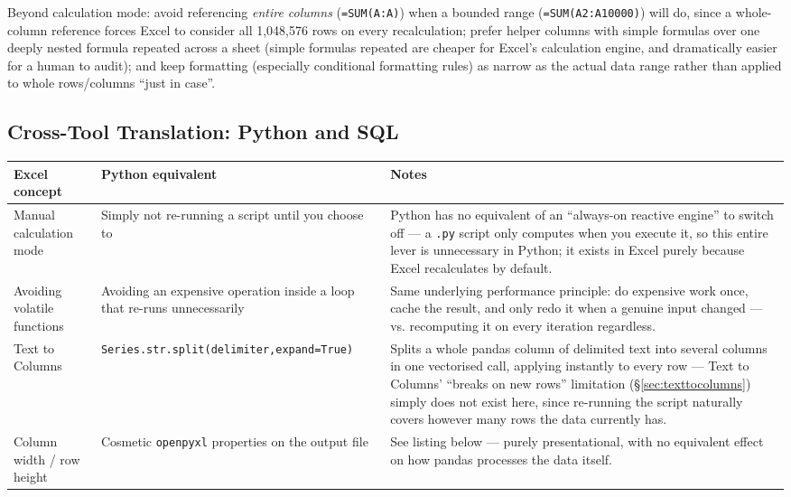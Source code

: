 \documentclass[11pt,a4paper]{article}
\begin{document}
\begin{protip}
Beyond calculation mode: avoid referencing \emph{entire columns} (\texttt{=SUM(A:A)}) when a bounded range (\texttt{=SUM(A2:A10000)}) will do, since a whole-column reference forces Excel to consider all 1,048,576 rows on every recalculation; prefer helper columns with simple formulas over one deeply nested formula repeated across a sheet (simple formulas repeated are cheaper for Excel's calculation engine, and dramatically easier for a human to audit); and keep formatting (especially conditional formatting rules) as narrow as the actual data range rather than applied to whole rows/columns ``just in case''.
\end{protip}

\subsection{Cross-Tool Translation: Python and SQL}

\begin{center}
\begin{tabular}{@{}L{3.0cm}L{4.4cm}L{5.2cm}@{}}
\toprule
\textbf{Excel concept} & \textbf{Python equivalent} & \textbf{Notes} \\
\midrule
Manual calculation mode & Simply not re-running a script until you choose to & Python has no equivalent of an ``always-on reactive engine'' to switch off --- a \texttt{.py} script only computes when you execute it, so this entire lever is unnecessary in Python; it exists in Excel purely because Excel recalculates by default. \\
Avoiding volatile functions & Avoiding an expensive operation inside a loop that re-runs unnecessarily & Same underlying performance principle: do expensive work once, cache the result, and only redo it when a genuine input changed --- vs. recomputing it on every iteration regardless. \\
Text to Columns & \texttt{Series.\allowbreak str.\allowbreak split(delimiter,\allowbreak expand=True)} & Splits a whole pandas column of delimited text into several columns in one vectorised call, applying instantly to every row --- Text to Columns' ``breaks on new rows'' limitation (\S\ref{sec:texttocolumns}) simply does not exist here, since re-running the script naturally covers however many rows the data currently has. \\
Column width / row height & Cosmetic \texttt{openpyxl} properties on the output file & See listing below --- purely presentational, with no equivalent effect on how pandas processes the data itself. \\
\bottomrule
\end{tabular}
\end{center}
\end{document}
